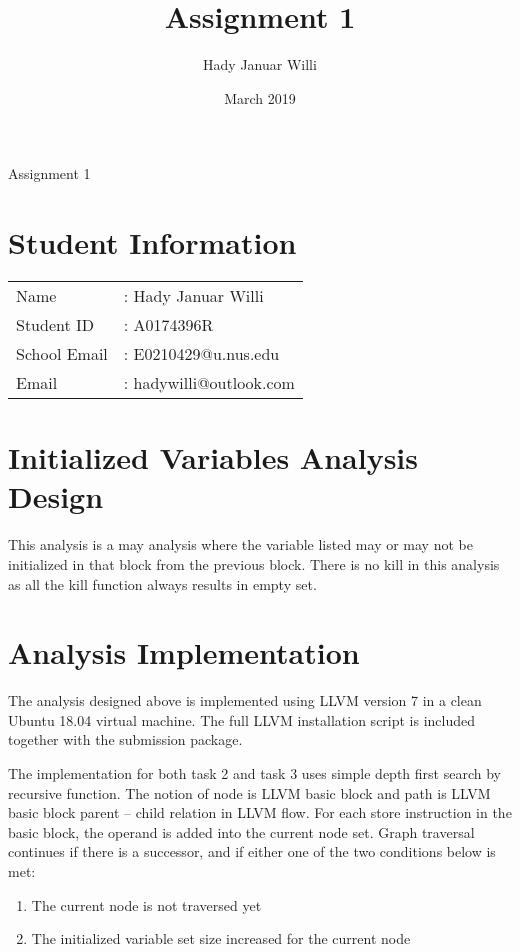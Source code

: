 \documentclass[11pt,a4paper,fleqn]{article}
\title{Assignment 1}
\author{Hady Januar Willi}
\date{March 2019}
\begin{document}
   \begin{center}
      \LARGE Assignment 1
   \end{center}
   \section{Student Information}

   \begin{tabular}{l l} 
      Name           & : Hady Januar Willi      \\ 
      Student ID     & : A0174396R              \\
      School Email   & : E0210429@u.nus.edu     \\
      Email          & : hadywilli@outlook.com  \\
   \end{tabular}
   
   \section{Initialized Variables Analysis Design}

   This analysis is a may analysis where the variable listed may or may not be initialized in that block from the previous block. 
   There is no kill in this analysis as all the kill function always results in empty set.

   \section{Analysis Implementation}

   The analysis designed above is implemented using LLVM version 7 in a clean Ubuntu 18.04 virtual machine. 
   The full LLVM installation script is included together with the submission package.
   
   The implementation for both task 2 and task 3 uses simple depth first search by recursive function. 
   The notion of node is LLVM basic block and path is LLVM basic block parent – child relation in LLVM flow. 
   For each store instruction in the basic block, the operand is added into the current node set. 
   Graph traversal continues if there is a successor, and if either one of the two conditions below is met:

   \begin{enumerate}
      \item The current node is not traversed yet
      \item The initialized variable set size increased for the current node
   \end{enumerate}
\end{document}
